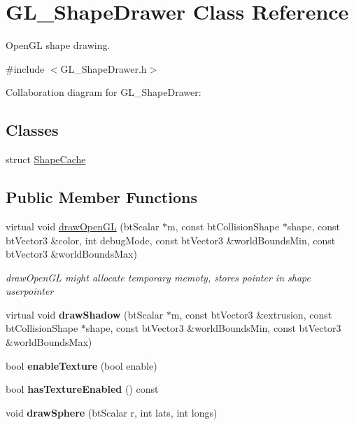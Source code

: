 \hypertarget{class_g_l___shape_drawer}{\section{G\+L\+\_\+\+Shape\+Drawer Class Reference}
\label{class_g_l___shape_drawer}
}


Open\+G\+L shape drawing.  




{\ttfamily \#include $<$G\+L\+\_\+\+Shape\+Drawer.\+h$>$}



Collaboration diagram for G\+L\+\_\+\+Shape\+Drawer\+:
\subsection*{Classes}
\begin{DoxyCompactItemize}
\item 
struct \hyperlink{struct_g_l___shape_drawer_1_1_shape_cache}{Shape\+Cache}
\end{DoxyCompactItemize}
\subsection*{Public Member Functions}
\begin{DoxyCompactItemize}
\item 
virtual void \hyperlink{class_g_l___shape_drawer_a93646a42c01e352249d2575ce40416f7}{draw\+Open\+G\+L} (bt\+Scalar $\ast$m, const bt\+Collision\+Shape $\ast$shape, const bt\+Vector3 \&color, int debug\+Mode, const bt\+Vector3 \&world\+Bounds\+Min, const bt\+Vector3 \&world\+Bounds\+Max)
\begin{DoxyCompactList}\small\item\em draw\+Open\+G\+L might allocate temporary memoty, stores pointer in shape userpointer \end{DoxyCompactList}\item 
\hypertarget{class_g_l___shape_drawer_a73fcdb31677d8ade6db58a1f71861fe1}{virtual void {\bfseries draw\+Shadow} (bt\+Scalar $\ast$m, const bt\+Vector3 \&extrusion, const bt\+Collision\+Shape $\ast$shape, const bt\+Vector3 \&world\+Bounds\+Min, const bt\+Vector3 \&world\+Bounds\+Max)}\label{class_g_l___shape_drawer_a73fcdb31677d8ade6db58a1f71861fe1}

\item 
\hypertarget{class_g_l___shape_drawer_a6be911a1ff9aabf1193e4be3e3b81b50}{bool {\bfseries enable\+Texture} (bool enable)}\label{class_g_l___shape_drawer_a6be911a1ff9aabf1193e4be3e3b81b50}

\item 
\hypertarget{class_g_l___shape_drawer_abf4b9cf6609d7afd82649420f09ab62f}{bool {\bfseries has\+Texture\+Enabled} () const }\label{class_g_l___shape_drawer_abf4b9cf6609d7afd82649420f09ab62f}

\item 
\hypertarget{class_g_l___shape_drawer_adffa8529cb8acbb63bc665dcba4d9a09}{void {\bfseries draw\+Sphere} (bt\+Scalar r, int lats, int longs)}\label{class_g_l___shape_drawer_adffa8529cb8acbb63bc665dcba4d9a09}

\end{DoxyCompactItemize}
